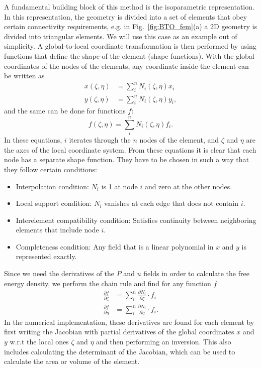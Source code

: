 A fundamental building block of this method is the isoparametric representation.
In this representation, the geometry is divided into a set of elements that obey certain connectivity requirements, e.g. in Fig.~\ref{fig:BTO_fem}(a) a 2D geometry is divided into triangular elements.
We will use this case as an example out of simplicity.
A global-to-local coordinate transformation is then performed by using functions that define the shape of the element (shape functions).
With the global coordinates of the nodes of the elements, any coordinate inside the element can be written as
\begin{align}
x(\zeta, \eta) &= \sum_i^n N_i(\zeta, \eta) x_i\\
y(\zeta, \eta) &= \sum_i^n N_i(\zeta, \eta) y_i,
\end{align}
and the same can be done for functions $f$:
\begin{equation}
	f(\zeta, \eta) = \sum_i^n N_i(\zeta, \eta) f_i.
\end{equation}
In these equations, $i$ iterates through the $n$ nodes of the element, and $\zeta$ and $\eta$ are the axes of the local coordinate system.
From these equations it is clear that each node has a separate shape function. They have to be chosen in such a way that they follow certain conditions:
\begin{itemize}
	\item Interpolation condition: $N_i$ is 1 at node $i$ and zero at the other nodes.
	\item Local support condition: $N_i$ vanishes at each edge that does not contain $i$.
	\item Interelement compatibility condition: Satisfies continuity between neighboring elements that include node $i$.
	\item Completeness condition: Any field that is a linear polynomial in $x$ and $y$ is represented exactly.
\end{itemize}

Since we need the derivatives of the $P$ and $u$ fields in order to calculate the free energy density, we perform the chain rule and find for any function $f$
\begin{align}
	\label{eq:BTO_derivatives}
	\frac{\partial f}{\partial \zeta} &= \sum_i^n \frac{\partial N_i}{\partial \zeta} \cdot f_i \\
	\frac{\partial f}{\partial \eta}  &= \sum_i^n \frac{\partial N_i}{\partial \eta} \cdot f_i.
\end{align}
In the numerical implementation, these derivatives are found for each element by first writing the Jacobian with partial derivatives of the global coordinates $x$ and $y$ w.r.t the local ones $\zeta$ and $\eta$ and then performing an inversion.
This also includes calculating the determinant of the Jacobian, which can be used to calculate the area or volume of the element.


